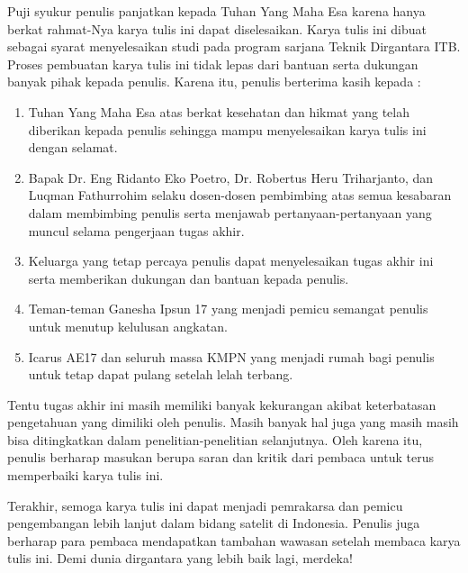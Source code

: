 Puji syukur penulis panjatkan kepada Tuhan Yang Maha Esa karena hanya berkat
rahmat-Nya karya tulis ini dapat diselesaikan. Karya tulis ini dibuat sebagai
syarat menyelesaikan studi pada program sarjana Teknik Dirgantara ITB. Proses
pembuatan karya tulis ini tidak lepas dari bantuan serta dukungan banyak pihak
kepada penulis. Karena itu, penulis berterima kasih kepada :

\begin{enumerate}
\item Tuhan Yang Maha Esa atas berkat kesehatan dan hikmat yang telah diberikan kepada penulis sehingga mampu menyelesaikan karya tulis ini dengan selamat.
\item Bapak Dr. Eng Ridanto Eko Poetro, Dr. Robertus Heru Triharjanto, dan Luqman Fathurrohim selaku dosen-dosen pembimbing atas semua kesabaran dalam membimbing penulis serta menjawab pertanyaan-pertanyaan yang muncul selama pengerjaan tugas akhir.
\item Keluarga yang tetap percaya penulis dapat menyelesaikan tugas akhir ini serta memberikan dukungan dan bantuan kepada penulis.
\item Teman-teman Ganesha Ipsun 17 yang menjadi pemicu semangat penulis untuk menutup kelulusan angkatan. 
\item Icarus AE17 dan seluruh massa KMPN yang menjadi rumah bagi penulis untuk tetap dapat pulang setelah lelah terbang.
\end{enumerate}

Tentu tugas akhir ini masih memiliki banyak kekurangan akibat keterbatasan
pengetahuan yang dimiliki oleh penulis. Masih banyak hal juga yang masih masih
bisa ditingkatkan dalam penelitian-penelitian selanjutnya. Oleh karena itu,
penulis berharap masukan berupa saran dan kritik dari pembaca untuk terus
memperbaiki karya tulis ini.

Terakhir, semoga karya tulis ini dapat menjadi pemrakarsa dan pemicu
pengembangan lebih lanjut dalam bidang satelit di Indonesia. Penulis juga
berharap para pembaca mendapatkan tambahan wawasan setelah membaca karya tulis
ini. Demi dunia dirgantara yang lebih baik lagi, merdeka!
